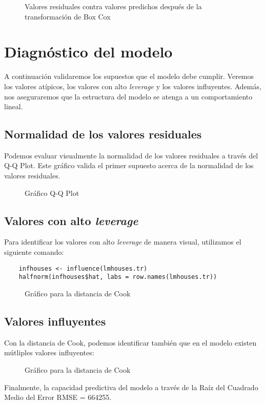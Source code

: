 \documentclass[10pt,letterpaper]{article}
\begin{document}
\begin{figure}[h!]
	\caption{Valores residuales contra valores predichos después de la transformación de Box Cox}
\end{figure}

\section{Diagnóstico del modelo}
A continuación validaremos los supuestos que el modelo debe cumplir. Veremos los valores atípicos, los valores con alto {\em leverage} y los valores influyentes. Además, nos aseguraremos que la estructura del modelo se atenga a un comportamiento lineal.

\subsection{Normalidad de los valores residuales}
Podemos evaluar visualmente la normalidad de los valores residuales a través del Q-Q Plot. Este gráfico valida el primer supuesto acerca de la normalidad de los valores residuales.

\begin{figure}[h!]
	\caption{Gráfico Q-Q Plot}
\end{figure}


\subsection{Valores con alto {\em leverage}}

Para identificar los valores con alto {\em leverage} de manera visual, utilizamos el siguiente comando:

\begin{verbatim}
	infhouses <- influence(lmhouses.tr)
	halfnorm(infhouses$hat, labs = row.names(lmhouses.tr))
\end{verbatim}

\begin{figure}[h!]
	\caption{Gráfico para la distancia de Cook}
\end{figure}



\subsection{Valores influyentes}
Con la distancia de Cook, podemos identificar también que en el modelo existen mútliples valores influyentes:

\begin{figure}[h]
	\caption{Gráfico para la distancia de Cook}
\end{figure}

Finalmente, la capacidad predictiva del modelo a través de la Raíz del Cuadrado Medio del Error RMSE = 664255.
\end{document}

